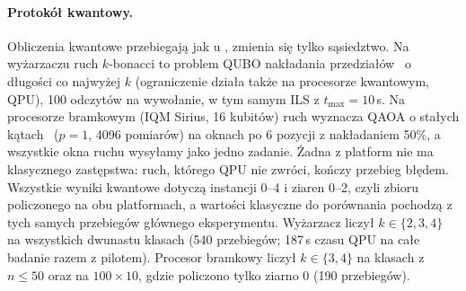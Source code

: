 \documentclass[letterpaper]{article} %
\theoremstyle{definition}
\begin{document}
\paragraph{Protokół kwantowy.} Obliczenia kwantowe przebiegają jak u \citet{wojewodzki2026windowed}, zmienia się tylko sąsiedztwo. Na wyżarzaczu ruch $k$-bonacci to problem QUBO
nakładania przedziałów~\cite{lucas2014ising,kadowaki1998} o długości co najwyżej $k$ (ograniczenie działa
także na procesorze kwantowym, QPU), 100 odczytów na wywołanie, w tym samym ILS
z $t_{\max}=10$\,s. Na procesorze bramkowym (IQM Sirius, 16 kubitów) ruch
wyznacza QAOA o stałych kątach~\cite{farhi2014qaoa,wojewodzki2026gcmm} ($p=1$, 4096 pomiarów) na oknach po 6
pozycji z nakładaniem 50\%, a wszystkie okna ruchu wysyłamy jako jedno
zadanie. Żadna z platform nie ma klasycznego zastępstwa: ruch, którego
QPU nie zwróci, kończy przebieg błędem. Wszystkie wyniki kwantowe
dotyczą instancji 0--4 i ziaren 0--2, czyli zbioru policzonego na obu
platformach, a wartości klasyczne do porównania pochodzą z tych samych
przebiegów głównego eksperymentu. Wyżarzacz liczył $k\in\{2,3,4\}$ na
wszystkich dwunastu klasach (540 przebiegów; 187\,s czasu QPU na całe
badanie razem z pilotem). Procesor bramkowy liczył $k\in\{3,4\}$ na
klasach z $n\leq 50$ oraz na $100\times 10$, gdzie policzono tylko
ziarno 0 (190 przebiegów).
\end{document}
